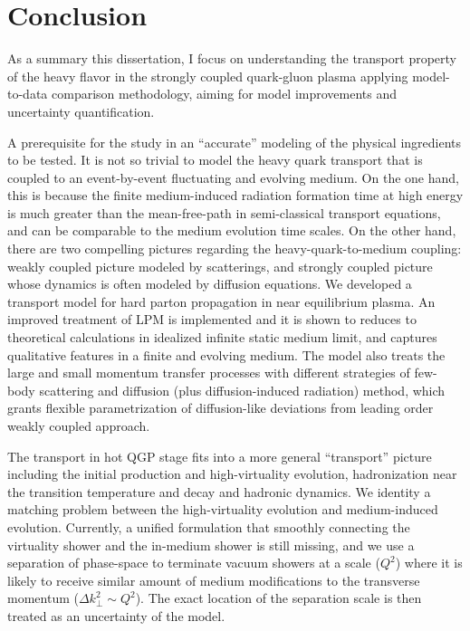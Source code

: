 \chapter{Conclusion}
\label{chapter:conclusion}
As a summary this dissertation, I focus on understanding the transport property of the heavy flavor in the strongly coupled quark-gluon plasma applying model-to-data comparison methodology, aiming for model improvements and uncertainty quantification.

A prerequisite for the study in an ``accurate'' modeling of the physical ingredients to be tested.
It is not so trivial to model the heavy quark transport that is coupled to an event-by-event fluctuating and evolving medium.
On the one hand, this is because the finite medium-induced radiation formation time at high energy is much greater than the mean-free-path in semi-classical transport equations, and can be comparable to the medium evolution time scales.
On the other hand, there are two compelling pictures regarding the heavy-quark-to-medium coupling: weakly coupled picture modeled by scatterings, and strongly coupled picture whose dynamics is often modeled by diffusion equations.
We developed a transport model for hard parton propagation in near equilibrium plasma. 
An improved treatment of LPM is implemented and it is shown to reduces to theoretical calculations in idealized infinite static medium limit, and captures qualitative features in a finite and evolving medium.
The model also treats the large and small momentum transfer processes with different strategies of few-body scattering and diffusion (plus diffusion-induced radiation) method, which grants flexible parametrization of diffusion-like deviations from leading order weakly coupled approach.

The transport in hot QGP stage fits into a more general ``transport'' picture including the initial production and high-virtuality evolution, hadronization near the transition temperature and decay and hadronic dynamics.
We identity a matching problem between the high-virtuality evolution and medium-induced evolution.
Currently, a unified formulation that smoothly connecting the virtuality shower and the in-medium shower is still missing, and we use a separation of phase-space to terminate vacuum showers at a scale ($Q^2$) where it is likely to receive similar amount of medium modifications to the transverse momentum ($\Delta k_\perp^2 \sim Q^2$).
The exact location of the separation scale is then treated as an uncertainty of the model.

